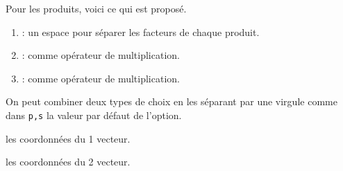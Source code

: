 \documentclass[12pt,a4paper]{article}
\begin{document}
            Pour les produits, voici ce qui est proposé.
\begin{enumerate}
	\item {} : un espace pour séparer les facteurs de chaque produit.

	\item {} :  comme opérateur de multiplication.

	\item {} :  comme opérateur de multiplication.
\end{enumerate}

            On peut combiner deux types de choix en les séparant par une virgule comme dans \verb+p,s+ la valeur par défaut de l'option.


 les coordonnées du 1\ier{} vecteur.

 les coordonnées du 2\ieme{} vecteur.
\end{document}
